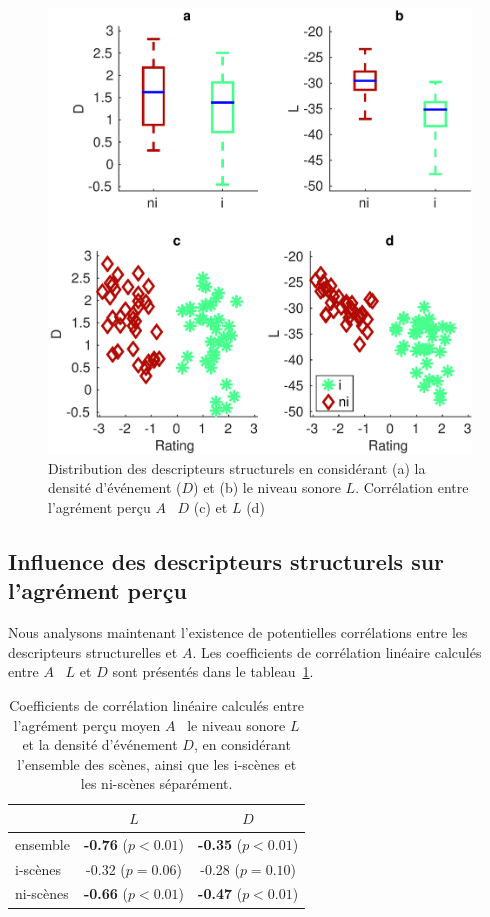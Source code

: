 \begin{figure}[bth]
        \myfloatalign
        \includegraphics[width=.8\linewidth]{gfxXpUrbanSoundscape/xp1_deSoLv_1-eps-converted-to}
       \caption[Distribution des descripteurs structurels et corrélation avec l'agrément perçu]{Distribution des descripteurs structurels en considérant (a) la densité d'événement ($D$) et (b) le niveau sonore $L$. Corrélation entre l'agrément perçu $A$ \vs~$D$ (c) et $L$ (d)}\label{fig:compCorrStruct}
\end{figure}

\subsection{Influence des descripteurs structurels sur l'agrément perçu}

Nous analysons maintenant l'existence de potentielles corrélations entre les descripteurs structurelles et $A$. Les coefficients de corrélation linéaire calculés entre $A$ \vs~$L$ et $D$ sont présentés dans le tableau~\ref{tab:corrStructA}.

\begin{table}[t]
\centering
\begin{tabular}{l c c} 
                & $L$                          & $D$    \\
\hline
ensemble        & \textbf{-0.76} ($p<0.01$)    & \textbf{-0.35} ($p<0.01$) \\
i-scènes        & -0.32 ($p=0.06$)             & -0.28 ($p=0.10$) \\
ni-scènes       & \textbf{-0.66} ($p<0.01$)    & \textbf{-0.47} ($p<0.01$) \\

\hline
\end{tabular}
\vspace{0.5mm}
\caption[Coefficients de corrélation linéaire calculés entre l'agrément perçu moyen $A$ \vs~le niveau sonore $L$ et la densité d'événement $D$]{Coefficients de corrélation linéaire calculés entre l'agrément perçu moyen $A$ \vs~le niveau sonore $L$ et la densité d'événement $D$, en considérant l'ensemble des scènes, ainsi que les i-scènes et les ni-scènes séparément.}
\label{tab:corrStructA}
\end{table}


